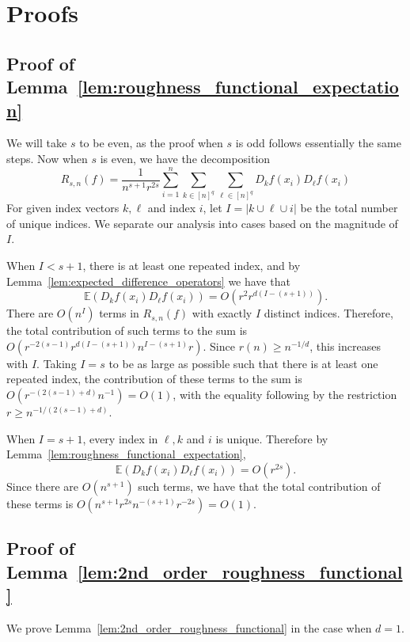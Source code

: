 \documentclass{article}
\newcommand{\abs}[1]{\left \lvert #1 \right \rvert}
\newcommand{\1}{\mathbf{1}}
\newcommand{\Ebb}{\mathbb{E}}
\theoremstyle{alden}
\theoremstyle{aldenthm}
\theoremstyle{definition}
\theoremstyle{remark}
\begin{document}
\section{Proofs}

\subsection{Proof of Lemma~\ref{lem:roughness_functional_expectation}}
We will take $s$ to be even, as the proof when $s$ is odd follows essentially the same steps. Now when $s$ is even, we have the decomposition
\begin{equation*}
R_{s,n}(f) = \frac{1}{n^{s+1}r^{2s}} \sum_{i = 1}^{n} \sum_{k \in [n]^q} \sum_{\ell \in [n]^q} D_kf(x_i) D_{\ell}f(x_i)
\end{equation*}
For given index vectors $k,\ell$ and index $i$, let $I = \abs{k \cup \ell \cup i}$ be the total number of unique indices. We separate our analysis into cases based on the magnitude of $I$. 

When $I < s + 1$, there is at least one repeated index, and by Lemma~\ref{lem:expected_difference_operators} we have that
\begin{equation*}
\Ebb(D_kf(x_i)D_{\ell}f(x_i)) = O(r^2r^{d(I - (s + 1))}).
\end{equation*}
There are $O(n^{I})$ terms in $R_{s,n}(f)$ with exactly $I$ distinct indices. Therefore, the total contribution of such terms to the sum is $O(r^{-2(s - 1)}r^{d(I - (s + 1))}n^{I - (s + 1)}r)$. Since $r(n) \geq n^{-1/d}$, this increases with $I$. Taking $I = s$ to be as large as possible such that there is at least one repeated index, the contribution of these terms to the sum is $O(r^{-(2(s - 1) + d)}n^{-1}) = O(1)$, with the equality following by the restriction $r \geq n^{-1/(2(s - 1) + d)}$. 

When $I = s + 1$, every index in $\ell,k$ and $i$ is unique. Therefore by Lemma~\ref{lem:roughness_functional_expectation},  
\begin{equation*}
\Ebb(D_kf(x_i)D_{\ell}f(x_i)) = O(r^{2s}).
\end{equation*}
Since there are $O(n^{s+1})$ such terms, we have that the total contribution of these terms is $O(n^{s + 1}r^{2s}n^{-(s + 1)}r^{-2s}) = O(1)$.

\subsection{Proof of Lemma~\ref{lem:2nd_order_roughness_functional}}
We prove Lemma~\ref{lem:2nd_order_roughness_functional} in the case when $d = 1$.
\end{document}
